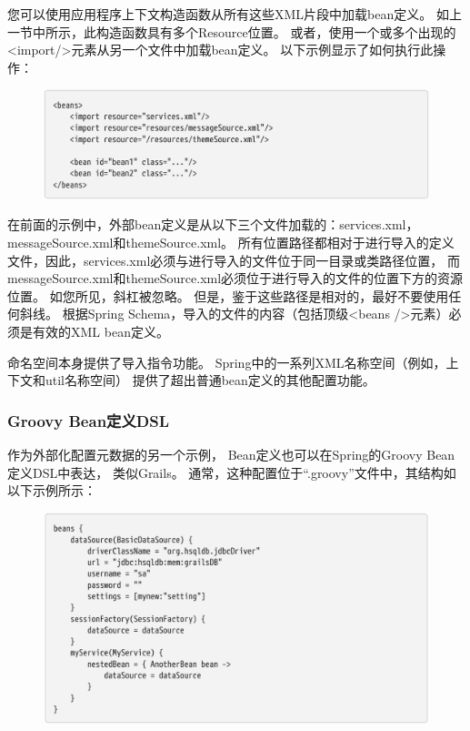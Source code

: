  您可以使用应用程序上下文构造函数从所有这些XML片段中加载bean定义。 
 如上一节中所示，此构造函数具有多个Resource位置。
  或者，使用一个或多个出现的<import/>元素从另一个文件中加载bean定义。 
  以下示例显示了如何执行此操作：

  \begin{figure}[ht]
    \centering
    \includegraphics[width=1\linewidth]{./Figure/IMG_code_5.png}
    \end{figure}

    在前面的示例中，外部bean定义是从以下三个文件加载的：services.xml，messageSource.xml和themeSource.xml。 
    所有位置路径都相对于进行导入的定义文件，因此，services.xml必须与进行导入的文件位于同一目录或类路径位置，
    而messageSource.xml和themeSource.xml必须位于进行导入的文件的位置下方的资源位置。 
    如您所见，斜杠被忽略。 但是，鉴于这些路径是相对的，最好不要使用任何斜线。 
    根据Spring Schema，导入的文件的内容（包括顶级<beans />元素）必须是有效的XML bean定义。

    命名空间本身提供了导入指令功能。 
    Spring中的一系列XML名称空间（例如，上下文和util名称空间）
    提供了超出普通bean定义的其他配置功能。

\subsubsection{Groovy Bean定义DSL}
作为外部化配置元数据的另一个示例，
Bean定义也可以在Spring的Groovy Bean定义DSL中表达，
类似Grails。 
通常，这种配置位于“.groovy”文件中，其结构如以下示例所示：

\begin{figure}[ht]
    \centering
    \includegraphics[width=1\linewidth]{./Figure/IMG_code_6.png}
    \end{figure}
    

